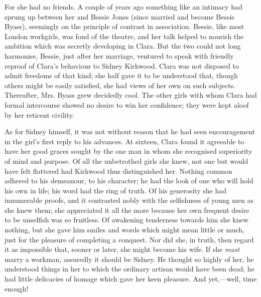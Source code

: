 For she had no friends. A couple of years ago something like an intimacy
had sprung up between her and Bessie Jones (since married and become
Bessie Byass), seemingly on the principle of contrast in association.
Bessie, like most London workgirls, was fond of the theatre, and her
talk helped to nourish the ambition which was secretly developing in
Clara. But the two could not long harmonise, Bessie, just after her
marriage, ventured to speak with friendly reproof of Clara's
{\protect\hypertarget{200}{}{}}behaviour to Sidney Kirkwood. Clara was
not disposed to admit freedoms of that kind; she half gave it to be
understood that, though others might be easily satisfied, she had views
of her own on such subjects. Thereafter, Mrs. Byass grew decidedly cool.
The other girls with whom Clara had formal intercourse showed no desire
to win her confidence; they were kept aloof by her reticent civility.

As for Sidney himself, it was not without reason that he had seen
encouragement in the girl's first reply to his advances. At sixteen,
Clara found it agreeable to have her good graces sought by the one man
in whom she recognised superiority of mind and purpose. Of all the
unbetrothed girls she knew, not one but would have felt flattered had
Kirkwood thus distinguished her. Nothing common adhered to his
demeanour, to his character; he had the look of one who will hold his
own in life; his word had the ring of truth. Of his generosity she had
innumerable proofs, and it contrasted nobly with the selfishness of
young men as she knew them; she
{\protect\hypertarget{201}{}{}}appreciated it all the more because her
own frequent desire to be unselfish was so fruitless. Of awakening
tenderness towards him she knew nothing, but she gave him smiles and
words which might mean little or much, just for the pleasure of
completing a conquest. Nor did she, in truth, then regard it as
impossible that, sooner or later, she might become his wife. If she
\emph{must} marry a workman, assuredly it should be Sidney. He thought
so highly of her, he understood things in her to which the ordinary
artisan would have been dead; he had little delicacies of homage which
gave her keen pleasure. And yet,---well, time enough!

